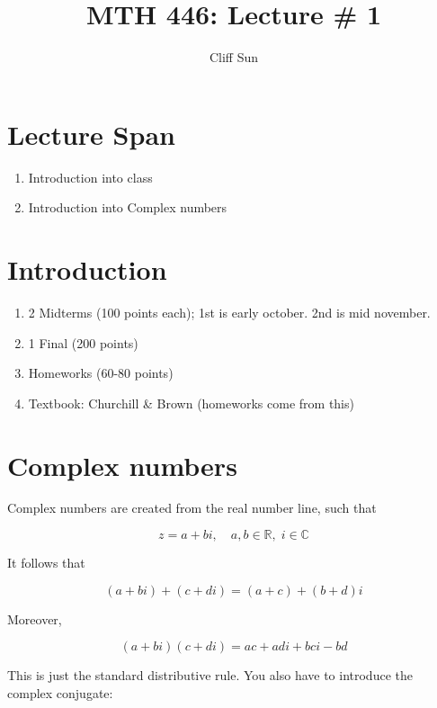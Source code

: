 \documentclass{article}
\title{MTH 446: Lecture \# 1}
\author{Cliff Sun}
\newtheorem{one minute paper}[theorem]{One Minute Paper}
\begin{document}
\maketitle

\section*{Lecture Span}
\begin{enumerate}
    \item Introduction into class
    \item Introduction into Complex numbers
\end{enumerate}

\section*{Introduction}
\begin{enumerate}
    \item 2 Midterms (100 points each); 1st is early october. 2nd is mid november. 
    \item 1 Final (200 points)
    \item Homeworks (60-80 points)
    \item Textbook: Churchill \& Brown (homeworks come from this)
\end{enumerate}

\section*{Complex numbers}

Complex numbers are created from the real number line, such that 

\begin{equation}
    z = a + bi, \quad a,b \in \mathbb{R}, \; i \in \mathbb{C}
\end{equation}

It follows that 

\begin{equation}
    (a + bi) + (c + di) = (a + c) + (b + d)i
\end{equation}

Moreover, 

\begin{equation}
    (a + bi)(c + di) = ac + adi + bci - bd
\end{equation}

This is just the standard distributive rule. You also have to introduce the complex conjugate:
\end{document}
